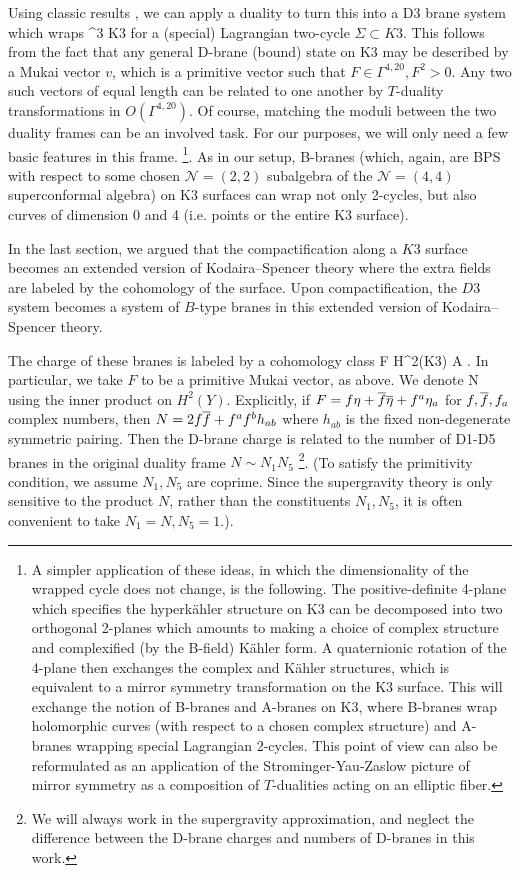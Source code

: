 \documentclass[../main.tex]{subfiles}
\begin{document}
Using classic results \cite{Dijkgraaf:1998gf}, we can apply a duality to turn this into a D3 brane system which wraps 
\beqn
\C {} \times \Sigma \subset \C^3 \times K3 
\eeqn
for a (special) Lagrangian two-cycle $\Sigma \subset K3$. 
This follows from the fact that any general D-brane (bound) state on K3 may be described by a Mukai vector $v$, which is a primitive vector such that $F \in \Gamma^{4, 20}, F^2>0$. 
Any two such vectors of equal length can be related to one another by $T$-duality transformations in $O(\Gamma^{4, 20})$. Of course, matching the moduli between the two duality frames can be an involved task. For our purposes, we will only need a few basic features in this frame. \footnote{A simpler application of these ideas, in which the dimensionality of the wrapped cycle does not change, is the following. The positive-definite 4-plane which specifies the hyperk{\"a}hler structure on K3 can be decomposed into two orthogonal 2-planes which amounts to making a choice of complex structure and complexified (by the B-field) K{\"a}hler form. A quaternionic rotation of the 4-plane then exchanges the complex and K{\"a}hler structures, which is equivalent to a mirror symmetry transformation on the K3 surface. This will exchange the notion of B-branes and A-branes on K3, where B-branes wrap holomorphic curves (with respect to a chosen complex structure) and A-branes wrapping special Lagrangian 2-cycles. This point of view can also be reformulated as an application of the Strominger-Yau-Zaslow \cite{SYZ} picture of mirror symmetry as a composition of $T$-dualities acting on an elliptic fiber.}. As in our setup, B-branes (which, again, are BPS with respect to some chosen $\mathcal{N}=(2, 2)$ subalgebra of the $\mathcal{N}=(4, 4)$ superconformal algebra) on K3 surfaces can wrap not only 2-cycles, but also curves of dimension 0 and 4 (i.e. points or the entire K3 surface).

In the last section, we argued that the compactification along a $K3$ surface becomes an extended version of Kodaira--Spencer theory where the extra fields are labeled by the cohomology of the surface.
Upon compactification, the $D3$ system becomes a system of $B$-type branes in this extended version of Kodaira--Spencer theory.

The charge of these branes is labeled by a cohomology class 
\beqn
F \in H^2(K3) \subset A .
\eeqn
 In particular, we take $F$ to be a primitive Mukai vector, as above. We denote 
\beqn
N  {}
\eeqn
using the inner product on $H^2(Y)$. 
Explicitly, if $F = f \eta + \overline f \overline \eta + f^a \eta_a$ for $f, \overline f, f_a$ complex numbers, then $N = 2 f \overline f + f^{a} f^{b} h_{ab}$ where $h_{ab}$ is the fixed non-degenerate symmetric pairing. Then the D-brane charge is related to the number of D1-D5 branes in the original duality frame $N \sim N_1 N_5$ \footnote{We will always work in the supergravity approximation, and neglect the difference between the D-brane charges and numbers of D-branes in this work.}. (To satisfy the primitivity condition, we assume $N_1, N_5$ are coprime. Since the supergravity theory is only sensitive to the product $N$, rather than the constituents $N_1, N_5$, it is often convenient to take $N_1 = N, N_5 = 1$.).
\end{document}
